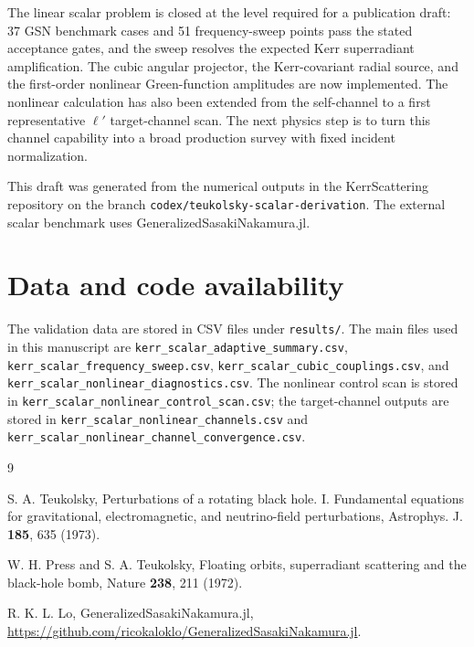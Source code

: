 \documentclass[aps,prd,twocolumn,nofootinbib,superscriptaddress,10pt]{revtex4-2}
\begin{document}
The linear scalar problem is closed at the level required for a publication
draft: 37 GSN benchmark cases and 51 frequency-sweep points pass the stated
acceptance gates, and the sweep resolves the expected Kerr superradiant
amplification.  The cubic angular projector, the Kerr-covariant radial source,
and the first-order nonlinear Green-function amplitudes are now implemented.
The nonlinear calculation has also been extended from the self-channel to a
first representative $\ell'$ target-channel scan.  The next physics step is to
turn this channel capability into a broad production survey with fixed incident
normalization.

\begin{acknowledgments}
This draft was generated from the numerical outputs in the KerrScattering
repository on the branch \texttt{codex/teukolsky-scalar-derivation}.  The
external scalar benchmark uses GeneralizedSasakiNakamura.jl.
\end{acknowledgments}

\section*{Data and code availability}

The validation data are stored in CSV files under \texttt{results/}.  The main
files used in this manuscript are
\texttt{kerr\_scalar\_adaptive\_summary.csv},
\texttt{kerr\_scalar\_frequency\_sweep.csv},
\texttt{kerr\_scalar\_cubic\_couplings.csv}, and
\texttt{kerr\_scalar\_nonlinear\_diagnostics.csv}.  The nonlinear control
scan is stored in
\texttt{kerr\_scalar\_nonlinear\_control\_scan.csv}; the target-channel
outputs are stored in \texttt{kerr\_scalar\_nonlinear\_channels.csv} and
\texttt{kerr\_scalar\_nonlinear\_channel\_convergence.csv}.

\begin{thebibliography}{9}

S. A. Teukolsky,
Perturbations of a rotating black hole. I. Fundamental equations for
gravitational, electromagnetic, and neutrino-field perturbations,
Astrophys. J. \textbf{185}, 635 (1973).

W. H. Press and S. A. Teukolsky,
Floating orbits, superradiant scattering and the black-hole bomb,
Nature \textbf{238}, 211 (1972).

R. K. L. Lo,
GeneralizedSasakiNakamura.jl,
\url{https://github.com/ricokaloklo/GeneralizedSasakiNakamura.jl}.

\end{thebibliography}
\end{document}
